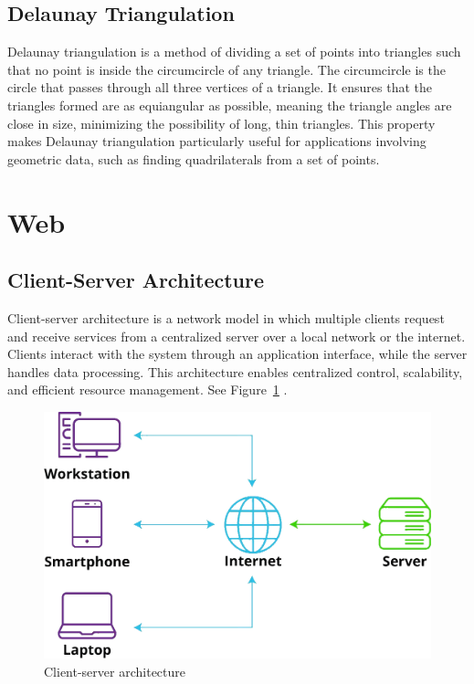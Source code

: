 \subsection*{Delaunay Triangulation}
\label{subsec:delaunay-triangulation}

Delaunay triangulation is a method of dividing a set of points into triangles such that no point is inside the circumcircle of any triangle. The circumcircle is the circle that passes through all three vertices of a triangle. It ensures that the triangles formed are as equiangular as possible,  meaning the triangle angles are close in size, minimizing the possibility of long, thin triangles. This property makes Delaunay triangulation particularly useful for applications involving geometric data, such as finding quadrilaterals from a set of points.

\section{Web}
\label{sec:web}

\subsection*{Client-Server Architecture}
\label{subsec:client-server}

Client-server architecture is a network model in which multiple clients request and receive services from a centralized server over a local network or the internet. Clients interact with the system through an application interface, while the server handles data processing. This architecture enables centralized control, scalability, and efficient resource management. See Figure~\ref{fig:client-server-architecture} \cite{liquidweb:client-server}.


\begin{figure}[h!]
    \centering
    \includegraphics[width=0.75\linewidth]{figures/theory/client-server-architecture.png}
    \caption[Client-server architecture]{Client-server architecture \cite{liquidweb:client-server}}
    \label{fig:client-server-architecture}
\end{figure}

